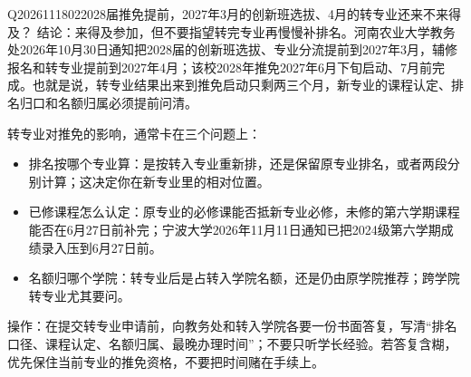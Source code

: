 \begin{qa}{Q2026111802}{2028届推免提前，2027年3月的创新班选拔、4月的转专业还来不来得及？}
结论：来得及参加，但不要指望转完专业再慢慢补排名。河南农业大学教务处2026年10月30日通知把2028届的创新班选拔、专业分流提前到2027年3月，辅修报名和转专业提前到2027年4月；该校2028年推免2027年6月下旬启动、7月前完成。也就是说，转专业结果出来到推免启动只剩两三个月，新专业的课程认定、排名归口和名额归属必须提前问清。

转专业对推免的影响，通常卡在三个问题上：

\begin{itemize}
\item 排名按哪个专业算：是按转入专业重新排，还是保留原专业排名，或者两段分别计算；这决定你在新专业里的相对位置。
\item 已修课程怎么认定：原专业的必修课能否抵新专业必修，未修的第六学期课程能否在6月27日前补完；宁波大学2026年11月11日通知已把2024级第六学期成绩录入压到6月27日前。
\item 名额归哪个学院：转专业后是占转入学院名额，还是仍由原学院推荐；跨学院转专业尤其要问。
\end{itemize}

操作：在提交转专业申请前，向教务处和转入学院各要一份书面答复，写清“排名口径、课程认定、名额归属、最晚办理时间”；不要只听学长经验。若答复含糊，优先保住当前专业的推免资格，不要把时间赌在手续上。
\end{qa}

